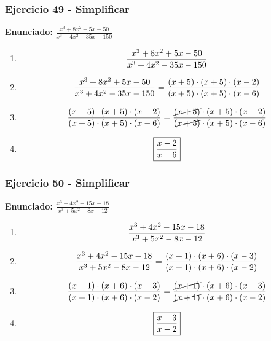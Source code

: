 \documentclass[11pt,a4paper]{article}
\newcommand{\fitmath}[1]{%
\[
\setbox0=\hbox{$\displaystyle #1$}%
\ifdim\wd0>\linewidth
\resizebox{\linewidth}{!}{$\displaystyle #1$}%
\else
#1%
\fi
\]
}
\begin{document}
\vspace{0.12cm}
\subsubsection*{Ejercicio 49 - Simplificar}
\textbf{Enunciado:} $ \frac{x^{3} + 8 x^{2} + 5 x - 50}{x^{3} + 4 x^{2} - 35 x - 150} $\par
\begin{enumerate}[leftmargin=2em]
\item \fitmath{\frac{x^{3} + 8 x^{2} + 5 x - 50}{x^{3} + 4 x^{2} - 35 x - 150}}
\item \fitmath{\frac{x^{3} + 8 x^{2} + 5 x - 50}{x^{3} + 4 x^{2} - 35 x - 150}=\frac{\left(x + 5\right)\cdot \left(x + 5\right)\cdot \left(x - 2\right)}{\left(x + 5\right)\cdot \left(x + 5\right)\cdot \left(x - 6\right)}}
\item \fitmath{\frac{\left(x + 5\right)\cdot \left(x + 5\right)\cdot \left(x - 2\right)}{\left(x + 5\right)\cdot \left(x + 5\right)\cdot \left(x - 6\right)}=\frac{\cancel{\left(x + 5\right)}\cdot \left(x + 5\right)\cdot \left(x - 2\right)}{\cancel{\left(x + 5\right)}\cdot \left(x + 5\right)\cdot \left(x - 6\right)}}
\item \fitmath{\boxed{\frac{x - 2}{x - 6}}}
\end{enumerate}

\vspace{0.12cm}
\subsubsection*{Ejercicio 50 - Simplificar}
\textbf{Enunciado:} $ \frac{x^{3} + 4 x^{2} - 15 x - 18}{x^{3} + 5 x^{2} - 8 x - 12} $\par
\begin{enumerate}[leftmargin=2em]
\item \fitmath{\frac{x^{3} + 4 x^{2} - 15 x - 18}{x^{3} + 5 x^{2} - 8 x - 12}}
\item \fitmath{\frac{x^{3} + 4 x^{2} - 15 x - 18}{x^{3} + 5 x^{2} - 8 x - 12}=\frac{\left(x + 1\right)\cdot \left(x + 6\right)\cdot \left(x - 3\right)}{\left(x + 1\right)\cdot \left(x + 6\right)\cdot \left(x - 2\right)}}
\item \fitmath{\frac{\left(x + 1\right)\cdot \left(x + 6\right)\cdot \left(x - 3\right)}{\left(x + 1\right)\cdot \left(x + 6\right)\cdot \left(x - 2\right)}=\frac{\cancel{\left(x + 1\right)}\cdot \left(x + 6\right)\cdot \left(x - 3\right)}{\cancel{\left(x + 1\right)}\cdot \left(x + 6\right)\cdot \left(x - 2\right)}}
\item \fitmath{\boxed{\frac{x - 3}{x - 2}}}
\end{enumerate}
\end{document}
